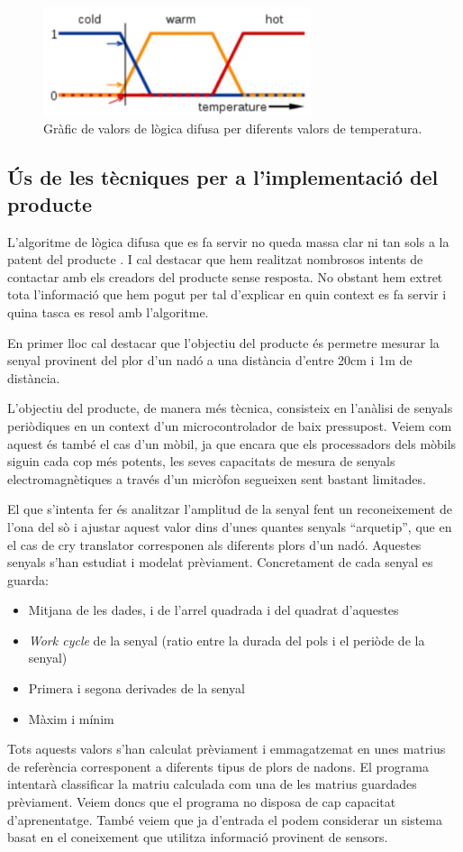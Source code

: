 \documentclass[11pt,a4paper]{article}
\begin{document}
\begin{figure}[b]
\centering
\includegraphics[width=0.7\textwidth]{./fig/fuzzy.png}
\caption{Gràfic de valors de lògica difusa per diferents valors de temperatura.}
\label{fig:calor}
\end{figure}
\clearpage


\subsection{\textsf{Ús de les tècniques per a l'implementació del producte}}
\label{us-tecniques}

L'algoritme de lògica difusa que es fa servir no queda massa clar ni tan sols a la patent del producte \cite{patent}. I cal destacar que hem realitzat nombrosos intents de contactar amb els creadors del producte sense resposta. No obstant hem extret tota l'informació que hem pogut per tal d'explicar en quin context es fa servir i quina tasca es resol amb l'algoritme.

En primer lloc cal destacar que l'objectiu del producte és permetre mesurar la senyal provinent del plor d'un nadó a una distància d'entre 20cm i 1m de distància.

L'objectiu del producte, de manera més tècnica, consisteix en l'anàlisi de senyals periòdiques en un context d'un microcontrolador de baix pressupost. Veiem com aquest és també el cas d'un mòbil, ja que encara que els processadors dels mòbils siguin cada cop més potents, les seves capacitats de mesura de senyals electromagnètiques a través d'un micròfon segueixen sent bastant limitades.

El que s'intenta fer és analitzar l'amplitud de la senyal fent un reconeixement de l'ona del sò i ajustar aquest valor dins d'unes quantes senyals ``arquetip'', que en el cas de cry translator corresponen als diferents plors d'un nadó. Aquestes senyals s'han estudiat i modelat prèviament. Concretament de cada senyal es guarda:
\begin{itemize}
\item Mitjana de les dades, i de l'arrel quadrada i del quadrat d'aquestes
\item \emph{Work cycle} de la senyal (ratio entre la durada del pols i el periòde de la senyal)
\item Primera i segona derivades de la senyal
\item Màxim i mínim
\end{itemize}
Tots aquests valors s'han calculat prèviament i emmagatzemat en unes matrius de referència corresponent a diferents tipus de plors de nadons. El programa intentarà classificar la matriu calculada com una de les matrius guardades prèviament. Veiem doncs que el programa no disposa de cap capacitat d'aprenentatge. També veiem que ja d'entrada el podem considerar un sistema basat en el coneixement que utilitza informació provinent de sensors.
\end{document}
